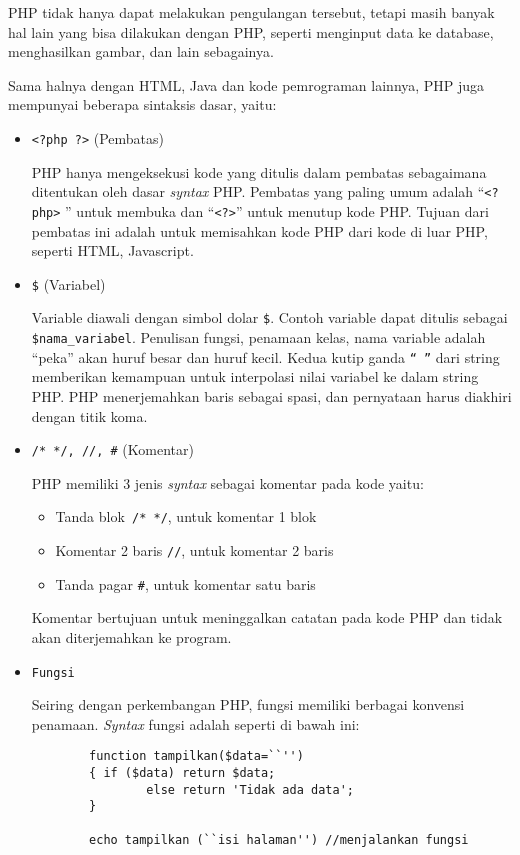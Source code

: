 PHP tidak hanya dapat melakukan pengulangan tersebut, tetapi masih banyak hal 
lain yang bisa dilakukan dengan PHP, seperti menginput data ke database, 
menghasilkan gambar, dan lain sebagainya.

Sama halnya dengan HTML, Java dan kode pemrograman lainnya, PHP juga mempunyai beberapa sintaksis dasar, yaitu:
\begin{itemize}
	\item \texttt{<?php ?>} (Pembatas)
	
	PHP hanya mengeksekusi kode yang ditulis dalam pembatas sebagaimana ditentukan oleh dasar \textit{syntax} PHP. Pembatas yang paling umum adalah ``\texttt{<?php>} '' untuk membuka dan ``\texttt{<?>}'' untuk menutup kode PHP. Tujuan dari pembatas ini adalah untuk memisahkan kode PHP dari kode di luar PHP, seperti HTML, Javascript.	
	\item \texttt{\$} (Variabel)
	
	Variable diawali dengan simbol dolar \texttt{\$}. Contoh variable dapat ditulis sebagai \texttt{\$nama\_variabel}. Penulisan fungsi, penamaan kelas, nama variable adalah ``peka'' akan huruf besar dan huruf kecil. Kedua kutip ganda \texttt{``  ''} dari string memberikan kemampuan untuk interpolasi nilai variabel ke dalam string PHP. PHP menerjemahkan baris sebagai spasi, dan pernyataan harus diakhiri dengan titik koma. %
	
	\item \texttt{/*   */, //, \#} (Komentar)
	
	PHP memiliki 3 jenis \textit{syntax} sebagai komentar pada kode yaitu:
	
	\begin{itemize}
		\item Tanda blok\texttt{ /*   */}, untuk komentar 1 blok
		\item Komentar 2 baris \texttt{//}, untuk komentar 2 baris
		\item Tanda pagar \texttt{\#}, untuk komentar satu baris
	\end{itemize}
	Komentar bertujuan untuk meninggalkan catatan pada kode PHP dan tidak akan diterjemahkan ke program.
	\item \texttt{Fungsi}
	
	Seiring dengan perkembangan PHP, fungsi memiliki berbagai konvensi penamaan. \textit{Syntax} fungsi adalah seperti di bawah ini:
	
	\begin{lstlisting}
		function tampilkan($data=``'')
		{ if ($data) return $data;
				else return 'Tidak ada data';
		}
		
		echo tampilkan (``isi halaman'') //menjalankan fungsi
	\end{lstlisting}
	
\end{itemize}
